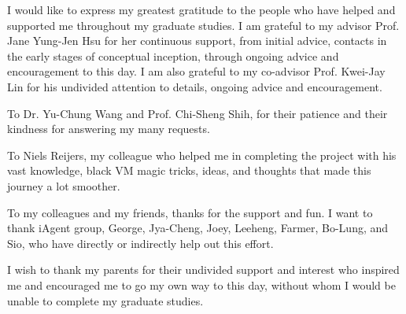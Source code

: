 \begin{acknowledgementsEN}

I would like to express my greatest gratitude to the people who have helped and
supported me throughout my graduate studies. I am grateful to my advisor Prof.
Jane Yung-Jen Hsu for her continuous support, from initial advice, contacts in
the early stages of conceptual inception, through ongoing advice and
encouragement to this day. I am also grateful to my co-advisor Prof. Kwei-Jay
Lin for his undivided attention to details, ongoing advice and encouragement. 

\vspace{8mm}

To Dr. Yu-Chung Wang and Prof. Chi-Sheng Shih, for their patience and their kindness for answering my many requests.

\vspace{8mm}

To Niels Reijers, my colleague who helped me in completing the project with his vast knowledge, black VM magic tricks, ideas, and thoughts that made this journey a lot smoother.

\vspace{8mm}

To my colleagues and my friends, thanks for the support and fun. I want to thank iAgent group, George, Jya-Cheng, Joey, Leeheng, Farmer, Bo-Lung, and Sio, who have directly or indirectly help out this effort.

\vspace{8mm}

I wish to thank my parents for their undivided support and interest who inspired me and encouraged me to go my own way to this day, without whom I would be unable to complete my graduate studies.

\end{acknowledgementsEN}
